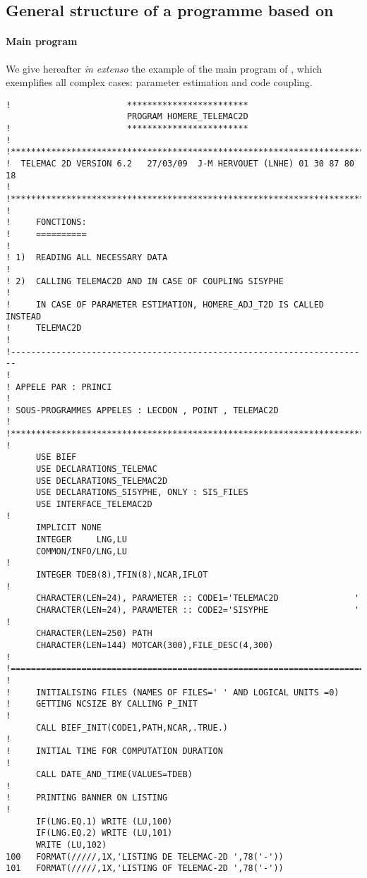 \subsection{General structure of a programme based on }

\paragraph{Main program}

We give hereafter \textit{in extenso} the example of the main program of
, which exemplifies all complex cases: parameter estimation and
code coupling.
\begin{lstlisting}[language=TelFortran]
!                       ************************
                        PROGRAM HOMERE_TELEMAC2D
!                       ************************
!
!***********************************************************************
!  TELEMAC 2D VERSION 6.2   27/03/09  J-M HERVOUET (LNHE) 01 30 87 80 18
!
!***********************************************************************
!
!     FONCTIONS:
!     ==========
!
! 1)  READING ALL NECESSARY DATA
!
! 2)  CALLING TELEMAC2D AND IN CASE OF COUPLING SISYPHE
!
!     IN CASE OF PARAMETER ESTIMATION, HOMERE_ADJ_T2D IS CALLED INSTEAD
!     TELEMAC2D
!
!-----------------------------------------------------------------------
!
! APPELE PAR : PRINCI
!
! SOUS-PROGRAMMES APPELES : LECDON , POINT , TELEMAC2D
!
!**********************************************************************
!
      USE BIEF
      USE DECLARATIONS_TELEMAC
      USE DECLARATIONS_TELEMAC2D
      USE DECLARATIONS_SISYPHE, ONLY : SIS_FILES
      USE INTERFACE_TELEMAC2D
!
      IMPLICIT NONE
      INTEGER     LNG,LU
      COMMON/INFO/LNG,LU
!
      INTEGER TDEB(8),TFIN(8),NCAR,IFLOT
!
      CHARACTER(LEN=24), PARAMETER :: CODE1='TELEMAC2D               '
      CHARACTER(LEN=24), PARAMETER :: CODE2='SISYPHE                 '
!
      CHARACTER(LEN=250) PATH
      CHARACTER(LEN=144) MOTCAR(300),FILE_DESC(4,300)
!
!======================================================================
!
!     INITIALISING FILES (NAMES OF FILES=' ' AND LOGICAL UNITS =0)
!     GETTING NCSIZE BY CALLING P_INIT
!
      CALL BIEF_INIT(CODE1,PATH,NCAR,.TRUE.)
!
!     INITIAL TIME FOR COMPUTATION DURATION
!
      CALL DATE_AND_TIME(VALUES=TDEB)
!
!     PRINTING BANNER ON LISTING
!
      IF(LNG.EQ.1) WRITE (LU,100)
      IF(LNG.EQ.2) WRITE (LU,101)
      WRITE (LU,102)
100   FORMAT(/////,1X,'LISTING DE TELEMAC-2D ',78('-'))
101   FORMAT(/////,1X,'LISTING OF TELEMAC-2D ',78('-'))

\end{lstlisting}

